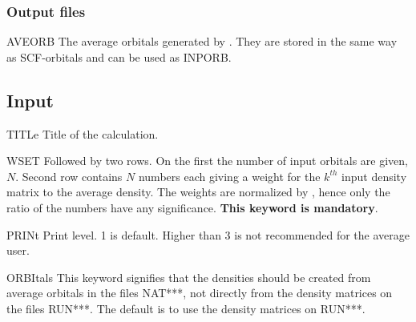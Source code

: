 \subsubsection{Output files}
\begin{filelist}
\item[AVEORB]
The average orbitals generated by . They are stored in
the same way as SCF-orbitals and can be used as INPORB.
\end{filelist}

\subsection{Input}
\label{UG:sec:averd_input}

\begin{keywordlist}
\item[TITLe]
Title of the calculation.
\item[WSET]
Followed by two rows. On the first the number of input orbitals are
given, $N$. Second row contains $N$ numbers each giving a weight
for the $k^{th}$ input density matrix to the average density. The
weights are normalized by , hence only the
ratio of the numbers have any significance. {\bf This keyword
is mandatory}.
\item[PRINt]
Print level. 1 is default. Higher than 3 is not recommended for the
average user.
\item[ORBItals]
This keyword signifies that the densities should be created from
average orbitals in the files NAT***, not directly from the density
matrices on the files RUN***. The default is to use the density
matrices on RUN***.

\end{keywordlist}
